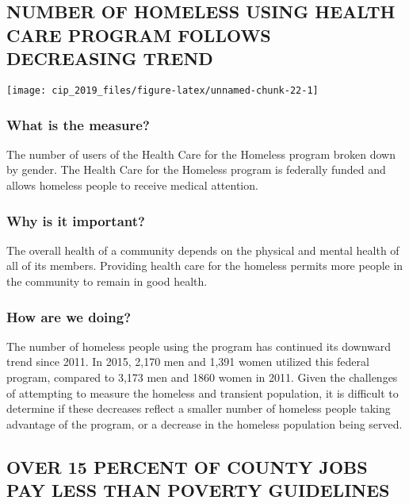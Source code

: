 \documentclass[]{book}
\theoremstyle{definition}
\theoremstyle{definition}
\theoremstyle{definition}
\theoremstyle{remark}
\begin{document}
\subsection*{NUMBER OF HOMELESS USING HEALTH CARE PROGRAM FOLLOWS
DECREASING
TREND}\label{number-of-homeless-using-health-care-program-follows-decreasing-trend}

\texttt{[image: cip\_2019\_files/figure-latex/unnamed-chunk-22-1]}

\subsubsection*{What is the measure?}\label{what-is-the-measure-12}

The number of users of the Health Care for the Homeless program broken
down by gender. The Health Care for the Homeless program is federally
funded and allows homeless people to receive medical attention.

\subsubsection*{Why is it important?}\label{why-is-it-important-10}

The overall health of a community depends on the physical and mental
health of all of its members. Providing health care for the homeless
permits more people in the community to remain in good health.

\subsubsection*{How are we doing?}\label{how-are-we-doing-14}

The number of homeless people using the program has continued its
downward trend since 2011. In 2015, 2,170 men and 1,391 women utilized
this federal program, compared to 3,173 men and 1860 women in 2011.
Given the challenges of attempting to measure the homeless and transient
population, it is difficult to determine if these decreases reflect a
smaller number of homeless people taking advantage of the program, or a
decrease in the homeless population being served.

\subsection*{OVER 15 PERCENT OF COUNTY JOBS PAY LESS THAN POVERTY
GUIDELINES}\label{over-15-percent-of-county-jobs-pay-less-than-poverty-guidelines}
\end{document}

